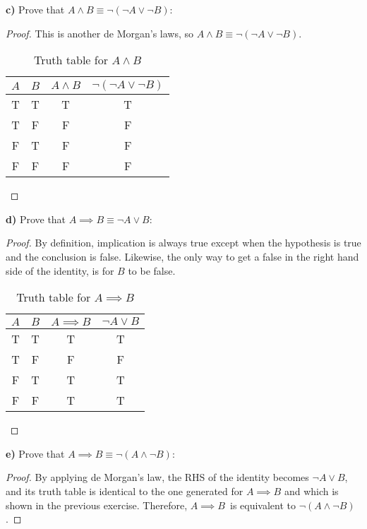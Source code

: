 \documentclass[titlepage, letterpaper, fleqn]{article}
\begin{document}
{\large \textbf{c)} Prove that \(A \wedge B \equiv \neg(\neg A \vee \neg B)\):}

\begin{proof}
This is another de Morgan's laws, so \(A \wedge B \equiv \neg(\neg A \vee \neg B)\).

\begin{table}[h!]
\centering
\begin{tabular}{@{}cccc@{}}
\toprule
\multicolumn{1}{l}{$A$} & \multicolumn{1}{l}{$B$} & \multicolumn{1}{l}{$A \wedge B$} & \multicolumn{1}{l}{$\neg (\neg A \vee \neg B)$} \\ \midrule
T & T & T & T \\
T & F & F & F \\
F & T & F & F \\
F & F & F & F \\ \bottomrule
\end{tabular}
\caption{Truth table for \(A \wedge B\)}
\label{fig:c}
\end{table}
\end{proof}

\pagebreak

{\large \textbf{d)} Prove that \(A \implies B \equiv \neg A 
\vee B\):}

\begin{proof}
By definition, implication is always true except when the hypothesis is true and the conclusion is false. Likewise, the only way to get a false in the right hand side of the identity, is for \(B\) to be false.

\begin{table}[h!]
\centering
\begin{tabular}{@{}cccc@{}}
\toprule
\multicolumn{1}{l}{$A$} & \multicolumn{1}{l}{$B$} & \multicolumn{1}{l}{$A \implies B$} & \multicolumn{1}{l}{$\neg A \vee B$} \\ \midrule
T & T & T & T \\
T & F & F & F \\
F & T & T & T \\
F & F & T & T \\ \bottomrule
\end{tabular}
\caption{Truth table for \(A \implies B\)}
\label{fig:d}
\end{table}
\end{proof}

{\large \textbf{e)} Prove that \(A \implies B \equiv \neg(A \wedge \neg B)\):}

\begin{proof}
By applying de Morgan's law, the RHS of the identity becomes \(\neg A 
\vee B\), and its truth table is identical to the one generated for \(A \implies B\) and which is shown in the previous exercise.
Therefore, \(A \implies B\)\ is equivalent to \(\neg(A \wedge \neg B)\).
\end{proof}
\end{document}
